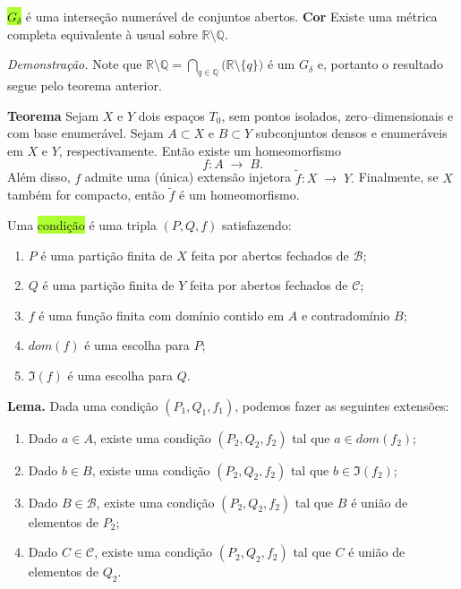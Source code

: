 \documentclass{article}
\begin{document}
\begin{landscape}
\begin{multicols}{3}
\colorbox{GreenYellow}{\(G_\delta\)} é uma interseção numerável de conjuntos abertos.
\medskip
\textbf{Cor} Existe uma métrica completa equivalente à usual sobre \(\mathbb{R}\setminus\mathbb{Q}\).

\textit{Demonstração.} Note que
$
\mathbb{R}\setminus\mathbb{Q}
=\bigcap_{q\in\mathbb{Q}}\bigl(\mathbb{R}\setminus\{q\}\bigr)
$
é um \(G_\delta\) e, portanto o resultado segue pelo teorema anterior.

\medskip

\textbf{Teorema} Sejam \(X\) e \(Y\) dois espaços \(T_0\), sem pontos isolados, zero–dimensionais e com base enumerável. Sejam \(A\subset X\) e \(B\subset Y\) subconjuntos densos e enumeráveis em \(X\) e \(Y\), respectivamente. Então existe um homeomorfismo
\[
f\colon A \;\longrightarrow\; B.
\]
Além disso, \(f\) admite uma (única) extensão injetora
$
\tilde f\colon X \;\longrightarrow\; Y.
$
Finalmente, se \(X\) também for compacto, então \(\tilde f\) é um homeomorfismo.

\medskip



Uma \colorbox{GreenYellow}{condição} é uma tripla \((P,Q,f)\) satisfazendo:
\begin{enumerate}
  \item \(P\) é uma partição finita de \(X\) feita por abertos fechados de \(\mathcal{B}\);
  \item \(Q\) é uma partição finita de \(Y\) feita por abertos fechados de \(\mathcal{C}\);
  \item \(f\) é uma função finita com domínio contido em \(A\) e contradomínio \(B\);
  \item \(dom(f)\) é uma escolha para \(P\);
  \item \(\Im(f)\) é uma escolha para \(Q\).
\end{enumerate}
\medskip

\textbf{Lema.} Dada uma condição \((P_1, Q_1, f_1)\), podemos fazer as seguintes extensões:
\begin{enumerate}
  \item Dado \(a\in A\), existe uma condição \((P_2, Q_2, f_2)\) tal que \(a\in dom(f_2)\);
  \item Dado \(b\in B\), existe uma condição \((P_2, Q_2, f_2)\) tal que \(b\in\Im(f_2)\);
  \item Dado \(B\in\mathcal{B}\), existe uma condição \((P_2, Q_2, f_2)\) tal que \(B\) é união de elementos de \(P_2\);
  \item Dado \(C\in\mathcal{C}\), existe uma condição \((P_2, Q_2, f_2)\) tal que \(C\) é união de elementos de \(Q_2\).
\end{enumerate}


\end{multicols}
\end{landscape}
\end{document}
